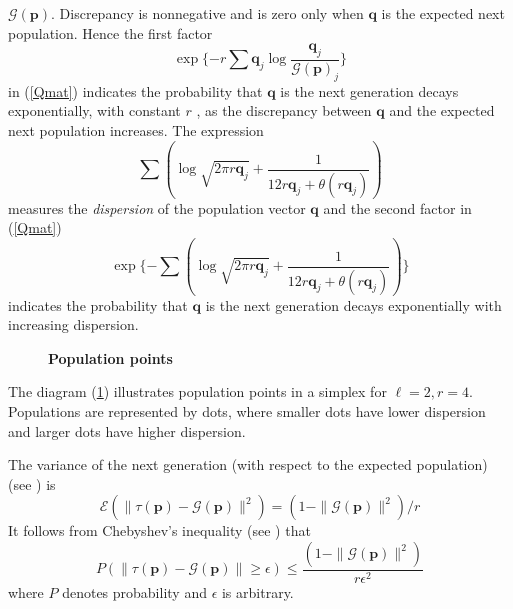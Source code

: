 $\mathcal{G}(\bm{p})$. Discrepancy is nonnegative and is zero only when $\bm{q}$ is the expected next population. Hence the first factor 
\[
\exp\{-r \sum \bm{q}_j \log \frac{\bm{q}_j}{\mathcal{G}(\bm{p})_j}\}
\]
in (\ref{Qmat}) indicates the probability that $\bm{q}$ is the next generation
decays exponentially, with constant $r$ , as the discrepancy between $\bm{q}$ and the
expected next population increases.
The expression 
\[
\sum (\log \sqrt{2 \pi r\bm{q}_j} + \frac{1}{12r\bm{q}_j + \theta (r\bm{q}_j)})
\]
measures the {\em dispersion} of the population vector $\bm{q}$ and the second factor in (\ref{Qmat}) 
\[
\exp\{- \sum (\log \sqrt{2 \pi r\bm{q}_j} + \frac{1}{12r\bm{q}_j + \theta (r\bm{q}_j)})\}
\]
indicates the probability that $\bm{q}$ is the next generation decays exponentially with increasing dispersion.

\begin{figure}[H]
\begin{center}
\hspace{4pt}
\caption{\textbf{Population points} }
\label{tetra_popn}
\end{center}
\end{figure}

The diagram (\ref{tetra_popn}) illustrates population points in a simplex for $\ell  =  2,  r  =  4$. Populations are represented by dots, 
where smaller dots have lower dispersion and larger dots have higher dispersion.

The variance of the next generation (with respect to the expected population) (see \cite{Vose1999}) is 
\begin{equation}
\label{RHSvariance}
\mathcal{E}(\| \tau (\bm{p}) - \mathcal{G}(\bm{p}) \|^2) = (1 - \|\mathcal{G}(\bm{p})\|^2) / r
\end{equation}
It follows from Chebyshev's inequality (see \cite{ChebyshevInequality}) that 
\begin{equation}
\label{Cheby}
P(\| \tau (\bm{p}) - \mathcal{G}(\bm{p}) \| \geq \epsilon) \leq \frac{(1 - \|\mathcal{G}(\bm{p})\|^2)} {r{\epsilon}^2}
\end{equation}
where $P$ denotes probability and $\epsilon$ is arbitrary.

